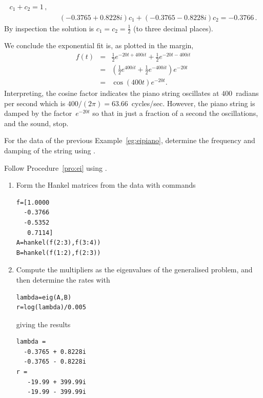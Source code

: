 \begin{draft}
\begin{example}
\begin{solution}
\begin{enumerate}
\begin{eqnarray*}
c_1+c_2=1\,, 
\\&&
(-0.3765 + 0.8228i)c_1+(-0.3765 - 0.8228i)c_2=-0.3766\,.
\end{eqnarray*}
By inspection the solution is \(c_1=c_2=\tfrac12\) (to three decimal places).
\end{enumerate}
%
We conclude the exponential fit is, as plotted in the margin,
\begin{eqnarray*}
f(t)&=&\tfrac12e^{-20t+400it}+\tfrac12e^{-20t-400it}
\\&=&\left(\tfrac12e^{400it}+\tfrac12e^{-400it}\right)e^{-20t}
\\&=&\cos(400t)e^{-20t}.
\end{eqnarray*}
Interpreting, the cosine factor indicates the piano string oscillates at \(400\)~radians per second which is \(400/(2\pi)=63.66\)~cycles/sec.
%
However, the piano string is damped by the factor~\(e^{-20t}\) so that in just a fraction of a second the oscillations, and the sound, stop.
\end{solution}
\end{example}




\begin{example} \label{eg:eipianu}
For the data of the previous Example~\ref{eg:eipiano}, determine the frequency and damping of the string using \script.

\begin{solution} 
Follow Procedure~\ref{pro:ei} using \script. 
\begin{enumerate}
\item Form the Hankel matrices from the data with commands
\begin{verbatim}
f=[1.0000
  -0.3766
  -0.5352
   0.7114]
A=hankel(f(2:3),f(3:4))
B=hankel(f(1:2),f(2:3))
\end{verbatim}
\setbox\ajrqrbox\hbox{}%
\marginpar{\usebox{\ajrqrbox}}%

\item Compute the multipliers as the eigenvalues of the generalised problem, and then determine the rates with
\begin{verbatim}
lambda=eig(A,B)
r=log(lambda)/0.005
\end{verbatim}
giving the results
\begin{verbatim}
lambda =
  -0.3765 + 0.8228i
  -0.3765 - 0.8228i
r =
   -19.99 + 399.99i
   -19.99 - 399.99i
\end{verbatim}



\end{enumerate}
\end{solution}
\end{example}
\end{draft}
